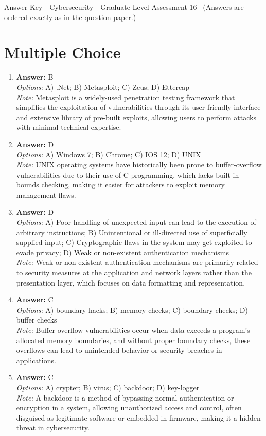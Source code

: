 \documentclass[12pt]{article}
\begin{document}
\begin{center}
Answer Key - Cybersecurity - Graduate Level Assessment 16 \
\small (Answers are ordered exactly as in the question paper.)
\end{center}

\section*{Multiple Choice}
\begin{enumerate}[label=\arabic*.]
\item \textbf{Answer:} B
\\ \textit{Options:} A) .Net; B) Metasploit; C) Zeus; D) Ettercap
\\ \textit{Note:} Metasploit is a widely-used penetration testing framework that simplifies the exploitation of vulnerabilities through its user-friendly interface and extensive library of pre-built exploits, allowing users to perform attacks with minimal technical expertise.
\item \textbf{Answer:} D
\\ \textit{Options:} A) Windows 7; B) Chrome; C) IOS 12; D) UNIX
\\ \textit{Note:} UNIX operating systems have historically been prone to buffer-overflow vulnerabilities due to their use of C programming, which lacks built-in bounds checking, making it easier for attackers to exploit memory management flaws.
\item \textbf{Answer:} D
\\ \textit{Options:} A) Poor handling of unexpected input can lead to the execution of arbitrary instructions; B) Unintentional or ill-directed use of superficially supplied input; C) Cryptographic flaws in the system may get exploited to evade privacy; D) Weak or non-existent authentication mechanisms
\\ \textit{Note:} Weak or non-existent authentication mechanisms are primarily related to security measures at the application and network layers rather than the presentation layer, which focuses on data formatting and representation.
\item \textbf{Answer:} C
\\ \textit{Options:} A) boundary hacks; B) memory checks; C) boundary checks; D) buffer checks
\\ \textit{Note:} Buffer-overflow vulnerabilities occur when data exceeds a program's allocated memory boundaries, and without proper boundary checks, these overflows can lead to unintended behavior or security breaches in applications.
\item \textbf{Answer:} C
\\ \textit{Options:} A) crypter; B) virus; C) backdoor; D) key-logger
\\ \textit{Note:} A backdoor is a method of bypassing normal authentication or encryption in a system, allowing unauthorized access and control, often disguised as legitimate software or embedded in firmware, making it a hidden threat in cybersecurity.
\end{enumerate}
\end{document}
